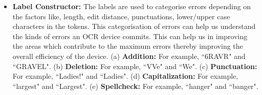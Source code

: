 \documentclass{acm_proc_article-sp}
\begin{document}
\begin{enumerate}
\begin{itemize}



\item \textbf{Label Constructor: } The labels are used to categorise errors depending on the factors like, length, edit distance, punctuations, lower/upper case characters in the tokens. This categorisation of errors can help us understand the kinds of errors an OCR device commits. This can help us in improving the areas which contribute to the maximum errors thereby improving the overall efficiency of the device.
(a) \textbf{Addition: } %
For example, ``6RAVR" and ``GRAVEL".
(b) \textbf{Deletion: }%
For example, ``VVe" and ``We".
(c) \textbf{Punctuation: }%
For example, ``Ladies!" and ``Ladies".
(d) \textbf{Capitalization: }%
For example, ``largest" and ``Largest".
(e) \textbf{Spellcheck: }%
For example, ``hanger" and ``banger".


\end{itemize}
\end{enumerate}
\end{document}
